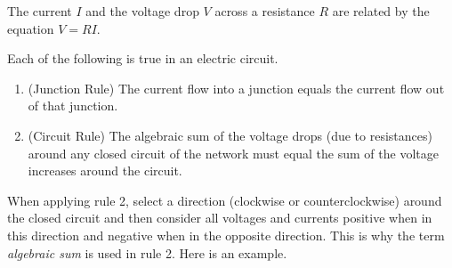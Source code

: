 \documentclass{ximera}
\begin{document}
\begin{theorem}\label{001806}

The current $I$ and the voltage drop $V$ across a resistance $R$ are related by the equation $V = RI$.

\end{theorem}

\begin{theorem}\label{001809}
    Each of the following is true in an electric circuit.
\begin{enumerate}
    \item\label{item:001809j}(Junction Rule) The current flow into a junction equals the current flow out of that junction.
    \item\label{item:001809c}(Circuit Rule) The algebraic sum of the voltage drops (due to resistances) around any closed circuit of the network must equal the sum of the voltage increases around the circuit.
\end{enumerate}

\end{theorem}

When applying rule 2, select a direction (clockwise or counterclockwise) around the closed circuit and then consider all voltages and currents positive when in this direction
and negative when in the opposite direction. This is why the term \textit{algebraic sum} is used in rule 2. Here is an example.
\end{document}
